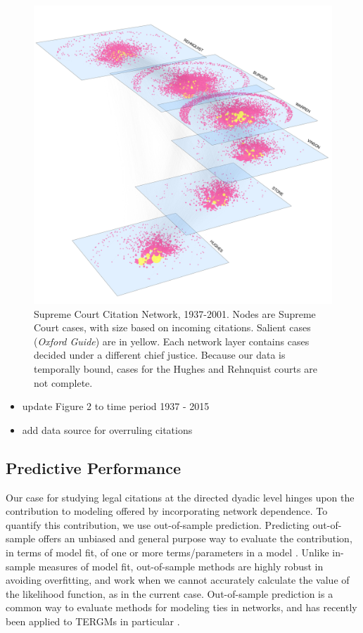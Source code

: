 \documentclass[headsepline=true, abstracton]{scrartcl}
\begin{document}
\begin{figure}[htp]
\includegraphics[scale=0.35,clip=true,trim=.5cm 0cm 0cm 2cm]{images/citations1}
\caption{ Supreme Court Citation Network, 1937-2001. Nodes are Supreme Court cases, with size based on incoming citations. Salient cases ({\em Oxford Guide}) are in yellow. Each network layer contains cases decided under a different chief justice. Because our data is temporally bound, cases for the Hughes and Rehnquist courts are not complete. }
 \label{fig:networkviz}
\vspace{-.25cm}
\end{figure}

\begin{itemize}
\item update Figure 2 to time period 1937 - 2015
\item add data source for overruling citations
\end{itemize}
  
  
\subsection{Predictive Performance}

Our case for studying legal citations at the directed dyadic level hinges upon the contribution to modeling offered by incorporating network dependence. To quantify this contribution, we use out-of-sample prediction. Predicting out-of-sample offers an unbiased and general purpose way to evaluate the contribution, in terms of model fit, of one or more terms/parameters in a model \citep{jensen2000multiple,ward2010perils}. Unlike in-sample measures of model fit, out-of-sample methods are highly robust in avoiding overfitting, and work when we cannot accurately calculate the value of the likelihood function, as in the current case. Out-of-sample prediction is a common way to evaluate methods for modeling ties in networks, and has recently been applied to TERGMs in particular \citep{desmarais2013forecasting,cranmer2017can}.
\end{document}
